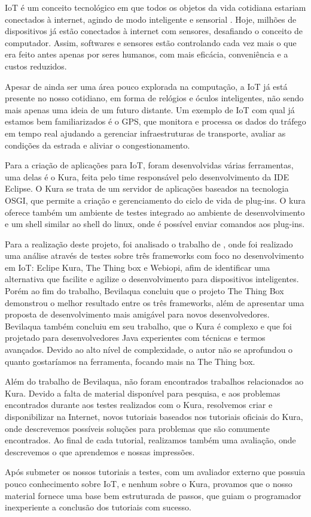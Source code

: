 IoT é um conceito tecnológico em que todos os objetos da vida cotidiana estariam conectados à internet, agindo de modo inteligente e sensorial \cite{IoTSignificado}. Hoje, milhões de dispositivos já estão conectados à internet com sensores, desafiando o conceito de computador. Assim, softwares e sensores estão controlando cada vez mais o que era feito antes apenas por seres humanos, com mais eficácia, conveniência e a custos reduzidos.

Apesar de ainda ser uma área pouco explorada na computação, a IoT já está presente no nosso cotidiano, em forma de relógios e óculos inteligentes, não sendo mais apenas uma ideia de um futuro distante. Um exemplo de IoT com qual já estamos bem familiarizados é o GPS, que monitora e processa os dados do tráfego em tempo real ajudando a gerenciar infraestruturas de transporte, avaliar as condições da estrada e aliviar o congestionamento.

Para a criação de aplicações para IoT, foram desenvolvidas várias ferramentas, uma delas é o Kura, feita pelo time responsável pelo desenvolvimento da IDE Eclipse. O Kura se trata de um servidor de aplicações baseados na tecnologia OSGI, que permite a criação e gerenciamento do ciclo de vida de plug-ins. O kura oferece também um ambiente de testes integrado ao ambiente de desenvolvimento e um shell similar ao shell do linux, onde é possível enviar comandos aos plug-ins.

Para a realização deste projeto, foi analisado o trabalho de \cite{bevilaqua2016analise}, onde foi realizado uma análise através de testes sobre três frameworks com foco no desenvolvimento em IoT: Eclipe Kura, The Thing box e Webiopi, afim de identificar uma alternativa que facilite e agilize o desenvolvimento para dispositivos inteligentes. Porém ao fim do trabalho, Bevilaqua concluiu que o projeto The Thing Box demonstrou o melhor resultado entre os três frameworks, além de apresentar uma proposta de desenvolvimento mais amigável para novos desenvolvedores. Bevilaqua também concluiu em seu trabalho, que o Kura é complexo e que foi projetado para desenvolvedores Java experientes com técnicas e termos avançados. Devido ao alto nível de complexidade, o autor não se aprofundou o quanto gostaríamos na ferramenta, focando mais na The Thing box.

Além do trabalho de Bevilaqua, não foram encontrados trabalhos relacionados ao Kura. Devido a falta de material disponível para pesquisa, e aos problemas encontrados durante aos testes realizados com o Kura, resolvemos criar e disponibilizar na Internet, novos tutoriais baseados nos tutoriais oficiais do Kura, onde descrevemos possíveis soluções para problemas que são comumente encontrados. Ao final de cada tutorial, realizamos também uma avaliação, onde descrevemos o que aprendemos e nossas impressões.


Após submeter os nossos tutoriais a testes, com um avaliador externo que possuia pouco conhecimento sobre IoT, e nenhum sobre o Kura, provamos que o nosso material fornece uma base bem estruturada de passos, que guiam o programador inexperiente a conclusão dos tutoriais com sucesso.
